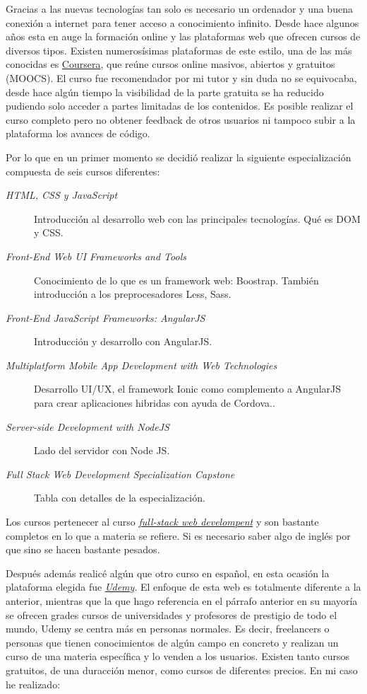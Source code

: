 Gracias a las nuevas tecnologías tan solo es necesario un ordenador y una buena conexión a internet para tener acceso a conocimiento infinito. Desde hace algunos años esta en auge la formación online y las plataformas web que ofrecen cursos de diversos tipos. Existen numerosísimas plataformas de este estilo, una de las más conocidas es  \hyperlink{www.coursera.org}{Coursera}, que reúne cursos online masivos, abiertos y gratuitos (MOOCS). El curso fue recomendador por mi tutor y sin duda no se equivocaba, desde hace algún tiempo la visibilidad de la parte gratuita se ha reducido pudiendo solo acceder a partes limitadas de los contenidos. Es posible realizar el curso completo pero no obtener feedback de otros usuarios ni tampoco subir a la plataforma los avances de código.

Por lo que en un primer momento se decidió realizar la siguiente especialización compuesta de seis cursos diferentes:

\begin{description}
	\item[\emph{HTML, CSS y JavaScript}] Introducción al desarrollo web con las principales tecnologías. Qué es DOM y CSS.
	\item[ \emph{Front-End Web UI Frameworks and Tools}] Conocimiento de lo que es un framework web: Boostrap. También introducción a los preprocesadores Less, Sass.
	\item[\emph{Front-End JavaScript Frameworks: AngularJS} ]  Introducción y desarrollo con AngularJS.
	\item[ \emph{Multiplatform Mobile App Development with Web Technologies}] Desarrollo UI/UX, el framework Ionic como complemento a AngularJS para  crear aplicaciones hibridas con ayuda de Cordova..
	\item[ \emph{Server-side Development with NodeJS} ] Lado del servidor con Node JS.
	\item[ \emph{Full Stack Web Development Specialization Capstone}] Tabla con detalles de la especialización.
\end{description}


Los cursos pertenecer al curso \hyperlink{https://www.coursera.org/specializations/full-stack}{\emph{full-stack web develompent}} y son bastante completos en lo que a materia se refiere. Si es necesario saber algo de inglés por que sino se hacen bastante pesados.

Después además realicé algún que otro curso en español, en esta ocasión la plataforma elegida fue  \hyperlink{https://www.udemy.com/}{\emph{Udemy}}. El enfoque de esta web es totalmente diferente a la anterior, mientras que la que hago referencia en el párrafo anterior en su mayoría se ofrecen grades cursos de universidades y profesores de prestigio de todo el mundo, Udemy se centra más en personas normales. Es decir, freelancers o personas que tienen conocimientos de algún campo en concreto y realizan un curso de una materia específica y lo venden a los usuarios. Existen tanto cursos gratuitos, de una duracción menor, como cursos de diferentes precios. En mi caso he realizado: 

